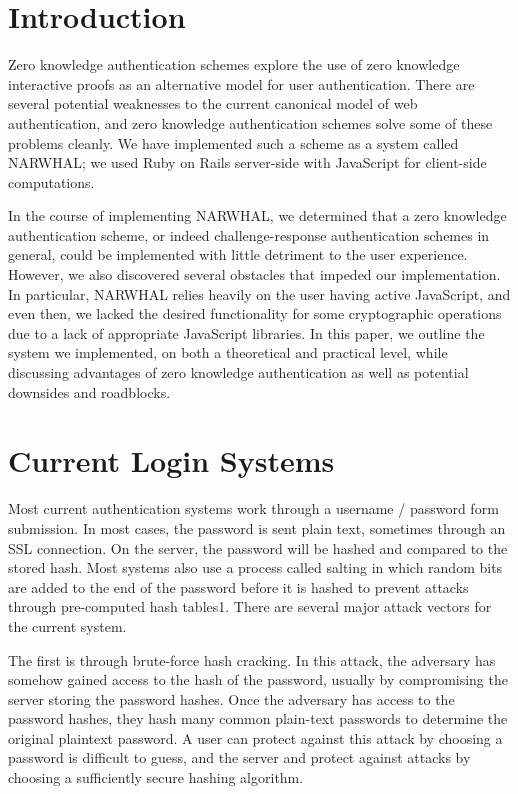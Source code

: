 \documentclass[11pt]{article}
\begin{document}
\section{Introduction}

Zero knowledge authentication schemes explore the use of zero knowledge interactive proofs as an alternative model for user authentication.  There are several potential weaknesses to the current canonical model of web authentication, and zero knowledge authentication schemes solve some of these problems cleanly.  We have implemented such a scheme as a system called NARWHAL; we used Ruby on Rails server-side with JavaScript for client-side computations.

In the course of implementing NARWHAL, we determined that a zero knowledge authentication scheme, or indeed challenge-response authentication schemes in general, could be implemented with little detriment to the user experience.  However, we also discovered several obstacles that impeded our implementation.  In particular, NARWHAL relies heavily on the user having active JavaScript, and even then, we lacked the desired functionality for some cryptographic operations due to a lack of appropriate JavaScript libraries.  In this paper, we outline the system we implemented, on both a theoretical and practical level, while discussing advantages of zero knowledge authentication as well as potential downsides and roadblocks.


\section{Current Login Systems}

Most current authentication systems work through a username / password  form submission.  In most cases, the password is sent plain text, sometimes through an SSL connection.  On the server, the password will be hashed and compared to the stored hash.  Most systems also use a process called salting in which random bits are added to the end of the password before it is hashed to prevent attacks through pre-computed hash tables1.  There are several major attack vectors for the current system.

The first is through brute-force hash cracking.  In this attack, the adversary has somehow gained access to the hash of the password, usually by compromising the server storing the password hashes.  Once the adversary has access to the password hashes, they hash many common plain-text passwords to determine the original plaintext password.  A user can protect against this attack by choosing a password is difficult to guess, and the server and protect against attacks by choosing a sufficiently secure hashing algorithm.
\end{document}
